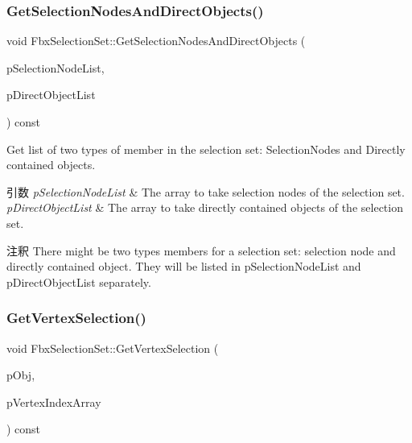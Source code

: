 \subsubsection{\texorpdfstring{Get\+Selection\+Nodes\+And\+Direct\+Objects()}{GetSelectionNodesAndDirectObjects()}}
{\footnotesize\ttfamily void Fbx\+Selection\+Set\+::\+Get\+Selection\+Nodes\+And\+Direct\+Objects (\begin{DoxyParamCaption}\item[{\hyperlink{class_fbx_array}{Fbx\+Array}$<$ \hyperlink{class_fbx_selection_node}{Fbx\+Selection\+Node} $\ast$$>$ \&}]{p\+Selection\+Node\+List,  }\item[{\hyperlink{class_fbx_array}{Fbx\+Array}$<$ \hyperlink{class_fbx_object}{Fbx\+Object} $\ast$$>$ \&}]{p\+Direct\+Object\+List }\end{DoxyParamCaption}) const}

Get list of two types of member in the selection set\+: Selection\+Nodes and Directly contained objects. 
\begin{DoxyParams}{引数}
{\em p\+Selection\+Node\+List} & The array to take selection nodes of the selection set. \\
\hline
{\em p\+Direct\+Object\+List} & The array to take directly contained objects of the selection set. \\
\hline
\end{DoxyParams}
\begin{DoxyRemark}{注釈}
There might be two types members for a selection set\+: selection node and directly contained object. They will be listed in p\+Selection\+Node\+List and p\+Direct\+Object\+List separately. 
\end{DoxyRemark}
\mbox{\label{class_fbx_selection_set_a4ec4d2f7e801768d621430636e849101}} 
\subsubsection{\texorpdfstring{Get\+Vertex\+Selection()}{GetVertexSelection()}}
{\footnotesize\ttfamily void Fbx\+Selection\+Set\+::\+Get\+Vertex\+Selection (\begin{DoxyParamCaption}\item[{\hyperlink{class_fbx_object}{Fbx\+Object} $\ast$}]{p\+Obj,  }\item[{\hyperlink{class_fbx_array}{Fbx\+Array}$<$ int $>$ \&}]{p\+Vertex\+Index\+Array }\end{DoxyParamCaption}) const}

